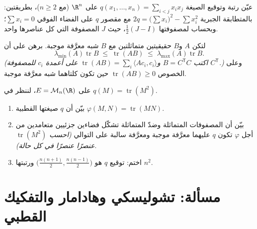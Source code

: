 \begin{exercise}[$\star\star$]\label{exo:b2:quadratic:10}
عيّن رتبة وتوقيع الصيغة $q(x_1, \dots, x_n) = \sum_{i <
j} x_ix_j$ على $\R^n$ (مع $n \geq 2$)، بطريقتين: بالمتطابقة الجبرية
$2q = \bigl(\sum x_i\bigr)^2 - \sum x_i^2$ مع مقصور $q$ على الفضاء الفوقي $\sum x_i = 0$؛
وبحساب  لمصفوفتها $\frac12(J - I)$،
حيث $J$ المصفوفة التي كل عناصرها واحد.
\end{exercise}

\begin{exercise}[$\star\star$]\label{exo:b2:quadratic:11}
لتكن $A$ و$B$ حقيقيتين متماثلتين مع $B$ شبه معرَّفة موجبة.
برهن على أن
\[
\lambda_{\min}(A)\operatorname{tr} B
\;\leq\;
\operatorname{tr}(AB)
\;\leq\;
\lambda_{\max}(A)\operatorname{tr} B .
\]
\emph{(اكتب $B = C^{\mathsf T}C$ و$\operatorname{tr}(AB) =
\sum_i \langle A c_i, c_i\rangle$ على أعمدة $c_i$ للمصفوفة
$C^{\mathsf T}$.)} وعلى الخصوص $\operatorname{tr}(AB) \geq 0$
حين تكون كلتاهما شبه معرَّفة موجبة.
\end{exercise}

\begin{exercise}[$\star\star\star$]\label{exo:b2:quadratic:12}
على $E = \mathcal{M}_n(\R)$، لننظر في $q(M) =
\operatorname{tr}(M^2)$.
\begin{enumerate}
  \item بيّن أن $q$  صيغتها القطبية
        $\varphi(M, N) = \operatorname{tr}(MN)$.
  \item بيّن أن المصفوفات المتماثلة وضدّ المتماثلة تشكّل
        فضاءين جزئيين متعامدين من أجل $\varphi$ تكون $q$ عليهما
        معرَّفة موجبة ومعرَّفة سالبة على التوالي
        \emph{(احسب $\operatorname{tr}(M^2)$ عنصرًا عنصرًا في
        كل حالة)}.
  \item اختم: توقيع $q$ هو $\bigl(\frac{n(n+1)}{2},
        \frac{n(n-1)}{2}\bigr)$ ورتبتها $n^2$.
\end{enumerate}
\end{exercise}

\section{مسألة: تشوليسكي وهادامار والتفكيك القطبي}

